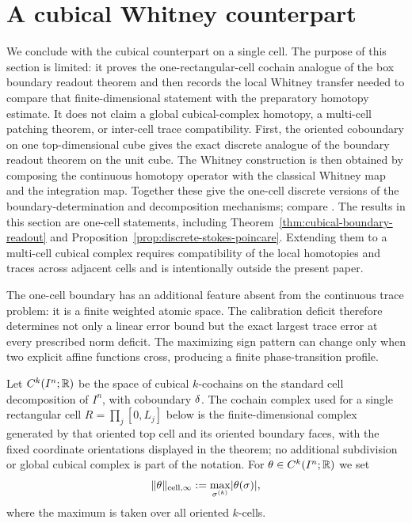 \section{A cubical Whitney counterpart}

We conclude with the cubical counterpart on a single cell. The purpose of this
section is limited: it proves the one-rectangular-cell cochain analogue of the
box boundary readout theorem and then records the local Whitney transfer needed
to compare that finite-dimensional statement with the preparatory homotopy
estimate.  It does not claim a global cubical-complex homotopy, a multi-cell
patching theorem, or inter-cell trace compatibility. First, the oriented
coboundary on one top-dimensional cube gives the exact discrete analogue of the
boundary readout theorem on the unit cube. The Whitney construction is then
obtained by composing the continuous homotopy operator with the classical
Whitney map and the integration map. Together these give the one-cell discrete
versions of the boundary-determination and decomposition mechanisms; compare
\cite{Whitney1957,Dodziuk1976,Dupont1976,DupontBook1978,Albert2020,
ArnoldFalkWinther2010,ArnoldAwanou2014,KaczynskiMischaikowMrozek2004}. The
results in this section are one-cell statements, including
Theorem~\ref{thm:cubical-boundary-readout} and
Proposition~\ref{prop:discrete-stokes-poincare}. Extending them to a multi-cell
cubical complex requires compatibility of the local homotopies and traces across
adjacent cells and is intentionally outside the present paper.

The one-cell boundary has an additional feature absent from the continuous
trace problem: it is a finite weighted atomic space.  The calibration deficit
therefore determines not only a linear error bound but the exact largest trace
error at every prescribed norm deficit.  The maximizing sign pattern can
change only when two explicit affine functions cross, producing a finite
phase-transition profile.

Let $C^k(I^n;\mathbb{R})$ be the space of cubical $k$-cochains on the standard cell
decomposition of $I^n$, with coboundary $\delta$. The cochain complex used for a
single rectangular cell $R=\prod_j[0,L_j]$ below is the finite-dimensional
complex generated by that oriented top cell and its oriented boundary faces,
with the fixed coordinate orientations displayed in the theorem; no additional
subdivision or global cubical complex is part of the notation. For
$\theta\in C^k(I^n;\mathbb{R})$ we set
\[
\lVert \theta \rVert_{\mathrm{cell},\infty}:=
\max_{\sigma^{(k)}}\lvert \theta(\sigma) \rvert,
\]
where the maximum is taken over all oriented $k$-cells.


